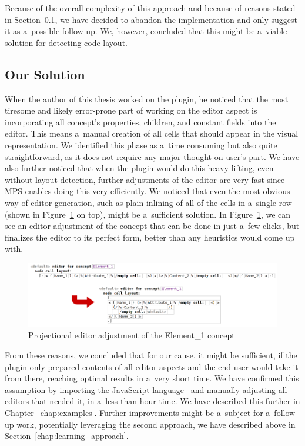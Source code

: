 Because of the overall complexity of this approach and because of reasons stated in Section~\ref{chap:editor_solution}, we have decided to abandon the implementation and only suggest it as a~possible follow-up.
We, however, concluded that this might be a~viable solution for detecting code layout.

\subsection{Our Solution}
\label{chap:editor_solution}

When the author of this thesis worked on the plugin, he noticed that the most tiresome and likely error-prone part of working on the editor aspect is incorporating all concept's properties, children, and constant fields into the editor.
This means a~manual creation of all cells that should appear in the visual representation.
We identified this phase as a~time consuming but also quite straightforward, as it does not require any major thought on user's part.
We have also further noticed that when the plugin would do this heavy lifting, even without layout detection, further adjustments of the editor are very fast since MPS enables doing this very efficiently.
We noticed that even the most obvious way of editor generation, such as plain inlining of all of the cells in a~single row (shown in Figure~\ref{fig:editor_adjustment} on top), might be a~sufficient solution.
In Figure~\ref{fig:editor_adjustment}, we can see an editor adjustment of the  concept that can be done in just a~few clicks, but finalizes the editor to its perfect form, better than any heuristics would come up with.
\\

\begin{figure}[h]
	\centering
	\includegraphics[width=\textwidth]{./img/editor_adjustment.png}
	\caption{Projectional editor adjustment of the Element{\_}1 concept}
	\label{fig:editor_adjustment}
\end{figure}

From these reasons, we concluded that for our cause, it might be sufficient, if the plugin only prepared contents of all editor aspects and the end user would take it from there, reaching optimal results in a~very short time.
We have confirmed this assumption by importing the JavaScript language~\cite{javascript} and manually adjusting all editors that needed it, in a~less than hour time.
We have described this further in Chapter~\ref{chap:examples}.
Further improvements might be a~subject for a~follow-up work, potentially leveraging the second approach, we have described above in Section~\ref{chap:learning_approach}.

